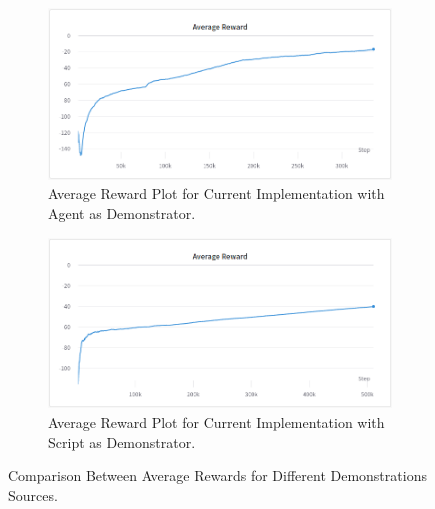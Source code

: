 \begin{figure}[h!]
     \centering
     \begin{subfigure}[b]{0.4\textwidth}
         \centering
         \includegraphics[width=\textwidth]{images/FPAPAAR.png}
         \caption{Average Reward Plot for Current Implementation with Agent as Demonstrator.}
     \end{subfigure}
     \begin{subfigure}[b]{0.4\textwidth}
         \centering
         \includegraphics[width=\textwidth]{images/FPAPSAR.png}
         \caption{Average Reward Plot for Current Implementation with Script as Demonstrator.}
     \end{subfigure}
        \caption{Comparison Between Average Rewards for Different Demonstrations Sources.}
        \label{fig:CDAR}
\end{figure}

